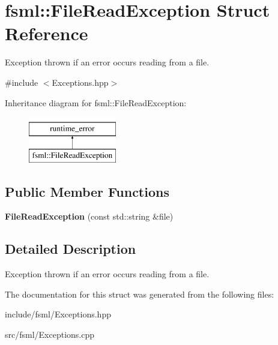 \hypertarget{structfsml_1_1FileReadException}{\section{fsml\-:\-:File\-Read\-Exception Struct Reference}
\label{structfsml_1_1FileReadException}
}


Exception thrown if an error occurs reading from a file.  




{\ttfamily \#include $<$Exceptions.\-hpp$>$}

Inheritance diagram for fsml\-:\-:File\-Read\-Exception\-:\begin{figure}[H]
\begin{center}
\leavevmode
\includegraphics[height=2.000000cm]{structfsml_1_1FileReadException}
\end{center}
\end{figure}
\subsection*{Public Member Functions}
\begin{DoxyCompactItemize}
\item 
\hypertarget{structfsml_1_1FileReadException_a659fb09fec2fb56251b07ff27ddc1389}{{\bfseries File\-Read\-Exception} (const std\-::string \&file)}\label{structfsml_1_1FileReadException_a659fb09fec2fb56251b07ff27ddc1389}

\end{DoxyCompactItemize}


\subsection{Detailed Description}
Exception thrown if an error occurs reading from a file. 



The documentation for this struct was generated from the following files\-:\begin{DoxyCompactItemize}
\item 
include/fsml/Exceptions.\-hpp\item 
src/fsml/Exceptions.\-cpp\end{DoxyCompactItemize}

